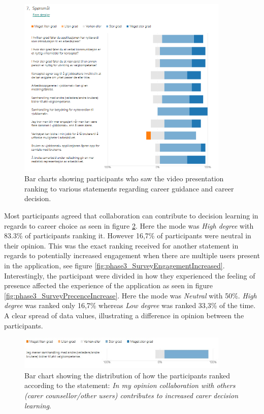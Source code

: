 \begin{figure}[H]
  \centering
   \captionsetup{width=.8\linewidth}
    \includegraphics[width=0.9\textwidth]{fig/phase_3/survey/valgKompentanseVideoPNG.PNG}
 \caption{Bar charts showing participants who saw the video presentation ranking to various statements regarding career guidance and career decision.}
\label{fig:phase3_SurveyValgkompVideo}
\end{figure}






Most participants agreed that collaboration can contribute to decision learning in regards to career choice as seen in figure \ref{fig:phase3_SurveyCollaborationIncreased}. Here the mode was \textit{High degree} with 83.3\% of participants ranking it. However 16,7\% of participants were neutral in their opinion. This was the exact ranking received for another statement in regards to potentially increased engagement when there are multiple users present in the application, see figure \ref{fig:phase3_SurveyEngagementIncreased}. Interestingly, the participant were divided in how they experienced the feeling of presence affected the experience of the application as seen in figure \ref{fig:phase3_SurveyPrecenceIncrease}. Here the mode was \textit{Neutral} with 50\%. \textit{High degree} was ranked only 16,7\% whereas \textit{Low degree} was ranked 33,3\% of the time. A clear spread of data values, illustrating a difference in opinion between the participants.


\begin{figure}[H]
  \centering
   \captionsetup{width=.8\linewidth}
    \includegraphics[width=0.9\textwidth]{fig/phase_3/survey/ValgKompAppSamhandlingOkt.jpg}
 \caption{Bar chart showing the distribution of how the participants ranked according to the statement: \textit{In my opinion collaboration with others (carer counsellor/other users) contributes to increased carer decision learning}.}
\label{fig:phase3_SurveyCollaborationIncreased}
\end{figure}

